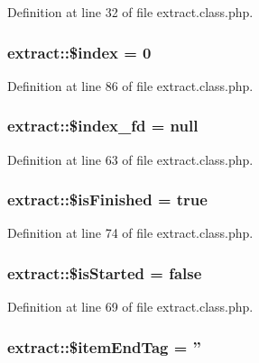 Definition at line 32 of file extract.\+class.\+php.

\hypertarget{classextract_a167ca671b16d1b95eef76886f6d91a0c}{
\subsubsection[{\$index}]{\setlength{\rightskip}{0pt plus 5cm}extract\+::\$index = 0}}\label{classextract_a167ca671b16d1b95eef76886f6d91a0c}


Definition at line 86 of file extract.\+class.\+php.

\hypertarget{classextract_a6805ee81f498cae226d90b8fa9ecba88}{
\subsubsection[{\$index\+\_\+fd}]{\setlength{\rightskip}{0pt plus 5cm}extract\+::\$index\+\_\+fd = null}}\label{classextract_a6805ee81f498cae226d90b8fa9ecba88}


Definition at line 63 of file extract.\+class.\+php.

\hypertarget{classextract_a0962c888279f7c5d551d3fdf1af1ee4c}{
\subsubsection[{\$is\+Finished}]{\setlength{\rightskip}{0pt plus 5cm}extract\+::\$is\+Finished = true}}\label{classextract_a0962c888279f7c5d551d3fdf1af1ee4c}


Definition at line 74 of file extract.\+class.\+php.

\hypertarget{classextract_a609fc88642ae3bf1e27f0232f1b21171}{
\subsubsection[{\$is\+Started}]{\setlength{\rightskip}{0pt plus 5cm}extract\+::\$is\+Started = false}}\label{classextract_a609fc88642ae3bf1e27f0232f1b21171}


Definition at line 69 of file extract.\+class.\+php.

\hypertarget{classextract_abddb079afc9c7c2f210e7793b93388e5}{
\subsubsection[{\$item\+End\+Tag}]{\setlength{\rightskip}{0pt plus 5cm}extract\+::\$item\+End\+Tag = ''}}\label{classextract_abddb079afc9c7c2f210e7793b93388e5}


